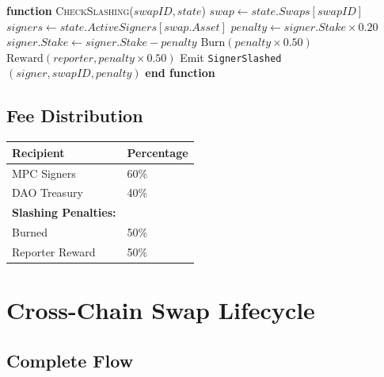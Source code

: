 \documentclass[11pt]{article}
\begin{document}
\begin{algorithmic}[1]
\State \textbf{function} \textsc{CheckSlashing}($swapID, state$)
    \State $swap \gets state.Swaps[swapID]$
            \State $signers \gets state.ActiveSigners[swap.Asset]$
                \State $penalty \gets signer.Stake \times 0.20$
                \State $signer.Stake \gets signer.Stake - penalty$
                \State $\text{Burn}(penalty \times 0.50)$
                \State $\text{Reward}(reporter, penalty \times 0.50)$
                \State Emit \texttt{SignerSlashed}$(signer, swapID, penalty)$
            \EndFor
        \EndIf
    \EndIf
\State \textbf{end function}
\end{algorithmic}


\subsection{Fee Distribution}

\begin{table}[h]
\centering
\begin{tabular}{@{}ll@{}}
\toprule
\textbf{Recipient} & \textbf{Percentage} \\
\midrule
MPC Signers & 60\% \\
DAO Treasury & 40\% \\
\midrule
\textbf{Slashing Penalties:} & \\
Burned & 50\% \\
Reporter Reward & 50\% \\
\bottomrule
\end{tabular}

\label{tab:fee-dist}
\end{table}

\section{Cross-Chain Swap Lifecycle}

\subsection{Complete Flow}
\end{document}
